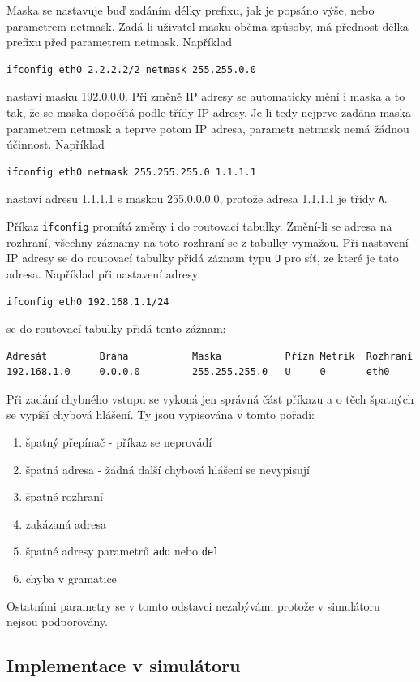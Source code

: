 Maska se nastavuje buď zadáním délky prefixu, jak je popsáno výše, nebo parametrem netmask. Zadá-li uživatel masku oběma způsoby, má přednost délka prefixu před parametrem netmask. Například
\begin{verbatim}ifconfig eth0 2.2.2.2/2 netmask 255.255.0.0\end{verbatim}
nastaví masku 192.0.0.0. Při změně IP adresy se automaticky mění i maska a to tak, že se maska dopočítá podle třídy IP adresy. Je-li tedy nejprve zadána maska parametrem netmask a teprve potom IP adresa, parametr netmask nemá žádnou účinnost. Například
\begin{verbatim}ifconfig eth0 netmask 255.255.255.0 1.1.1.1\end{verbatim}
nastaví adresu 1.1.1.1 s maskou 255.0.0.0.0, protože adresa 1.1.1.1 je třídy \verb|A|.

Příkaz \verb|ifconfig| promítá změny i do routovací tabulky. Změní-li se adresa na rozhraní, všechny záznamy na toto rozhraní se z tabulky vymažou. Při nastavení IP adresy se do routovací tabulky přidá záznam typu \verb|U| pro síť, ze které je tato adresa. Například při nastavení adresy
\begin{verbatim}ifconfig eth0 192.168.1.1/24\end{verbatim}
se do routovací tabulky přidá tento záznam:
\begin{verbatim}
Adresát         Brána           Maska           Přízn Metrik  Rozhraní
192.168.1.0     0.0.0.0         255.255.255.0   U     0       eth0
\end{verbatim}

Při zadání chybného vstupu se vykoná jen správná část příkazu a o těch špatných se vypíší chybová hlášení. Ty jsou vypisována v tomto pořadí:
\begin{enumerate}
\item špatný přepínač - příkaz se neprovádí
\item špatná adresa - žádná další chybová hlášení se nevypisují
\item špatné rozhraní
\item zakázaná adresa
\item špatné adresy parametrů \verb|add| nebo \verb|del|
\item chyba v gramatice
\end{enumerate}

Ostatními parametry se v tomto odstavci nezabývám, protože v simulátoru nejsou podporovány.


\subsection{Implementace v simulátoru}

